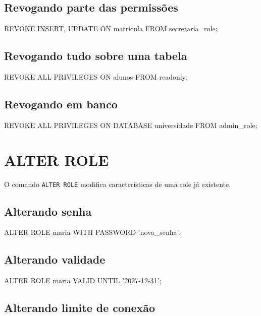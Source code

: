 \subsection{Revogando parte das permissões}

\begin{sqlcode}
REVOKE INSERT, UPDATE ON matricula FROM secretaria_role;
\end{sqlcode}

\subsection{Revogando tudo sobre uma tabela}

\begin{sqlcode}
REVOKE ALL PRIVILEGES ON alunos FROM readonly;
\end{sqlcode}

\subsection{Revogando em banco}

\begin{sqlcode}
REVOKE ALL PRIVILEGES ON DATABASE universidade FROM admin_role;
\end{sqlcode}

\section{ALTER ROLE}

O comando \texttt{ALTER ROLE} modifica características de uma role já existente.

\subsection{Alterando senha}

\begin{sqlcode}
ALTER ROLE maria WITH PASSWORD 'nova_senha';
\end{sqlcode}

\subsection{Alterando validade}

\begin{sqlcode}
ALTER ROLE maria VALID UNTIL '2027-12-31';
\end{sqlcode}

\subsection{Alterando limite de conexão}

